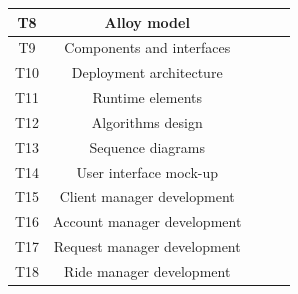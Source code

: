 \documentclass[a4paper,11pt]{report} %
\begin{document}
\begin{center}
{\begin{minipage}{\textwidth}
\begin{tabular}{| c | c | c | c | c |}
				\multicolumn{1}{|c|}{T8} & \multicolumn{1}{|c|}{Alloy model} & \multicolumn{1}{|c|}{} & \multicolumn{1}{|c|}{} & \multicolumn{1}{|c|}{}\\\hline	
				
				\multicolumn{1}{|c|}{T9} & \multicolumn{1}{|c|}{Components and interfaces} & \multicolumn{1}{|c|}{} & \multicolumn{1}{|c|}{} & \multicolumn{1}{|c|}{}\\\hline		
				
				\multicolumn{1}{|c|}{T10} & \multicolumn{1}{|c|}{Deployment architecture} & \multicolumn{1}{|c|}{} & \multicolumn{1}{|c|}{} & \multicolumn{1}{|c|}{}\\\hline			
				
				\multicolumn{1}{|c|}{T11} & \multicolumn{1}{|c|}{Runtime elements} & \multicolumn{1}{|c|}{} & \multicolumn{1}{|c|}{} & \multicolumn{1}{|c|}{}\\\hline			
				
				\multicolumn{1}{|c|}{T12} & \multicolumn{1}{|c|}{Algorithms design} & \multicolumn{1}{|c|}{} & \multicolumn{1}{|c|}{} & \multicolumn{1}{|c|}{}\\\hline	
				
				\multicolumn{1}{|c|}{T13} & \multicolumn{1}{|c|}{Sequence diagrams} & \multicolumn{1}{|c|}{} & \multicolumn{1}{|c|}{} & \multicolumn{1}{|c|}{}\\\hline				
		
				\multicolumn{1}{|c|}{T14} & \multicolumn{1}{|c|}{User interface mock-up} & \multicolumn{1}{|c|}{} & \multicolumn{1}{|c|}{} & \multicolumn{1}{|c|}{}\\\hline		
				
				\multicolumn{1}{|c|}{T15} & \multicolumn{1}{|c|}{Client manager development} & \multicolumn{1}{|c|}{} & \multicolumn{1}{|c|}{} & \multicolumn{1}{|c|}{}\\\hline	
				
				\multicolumn{1}{|c|}{T16} & \multicolumn{1}{|c|}{Account manager development} & \multicolumn{1}{|c|}{} & \multicolumn{1}{|c|}{} & \multicolumn{1}{|c|}{}\\\hline
				
				\multicolumn{1}{|c|}{T17} & \multicolumn{1}{|c|}{Request manager development} & \multicolumn{1}{|c|}{} & \multicolumn{1}{|c|}{} & \multicolumn{1}{|c|}{}\\\hline		
				
				\multicolumn{1}{|c|}{T18} & \multicolumn{1}{|c|}{Ride manager development} & \multicolumn{1}{|c|}{} & \multicolumn{1}{|c|}{} & \multicolumn{1}{|c|}{}\\\hline	
				

\end{tabular}
\end{minipage}}
\end{center}
\end{document}
